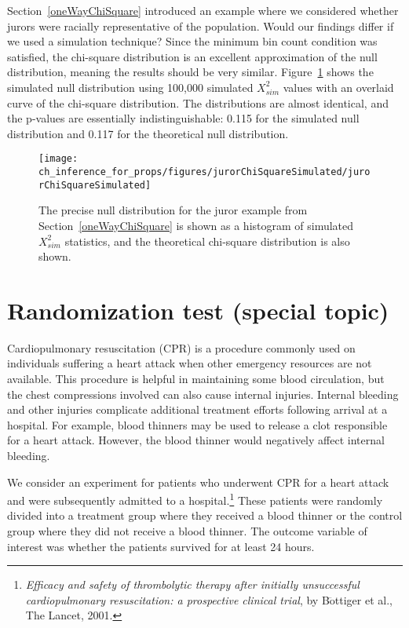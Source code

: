\begin{example}{Section~\ref{oneWayChiSquare} introduced an example where we considered whether jurors were racially representative of the population. Would our findings differ if we used a simulation technique?}
Since the minimum bin count condition was satisfied, the chi-square distribution is an excellent approximation of the null distribution, meaning the results should be very similar. Figure~\ref{jurorChiSquareSimulated} shows the simulated null distribution using 100,000 simulated $X_{sim}^2$ values with an overlaid curve of the chi-square distribution. The distributions are almost identical, and the p-values are essentially indistinguishable: 0.115 for the simulated null distribution and 0.117 for the theoretical null distribution.
\end{example}

\begin{figure}[h]
\centering
\texttt{[image: ch\_inference\_for\_props/figures/jurorChiSquareSimulated/jurorChiSquareSimulated]}
\caption{The precise null distribution for the juror example from Section~\ref{oneWayChiSquare} is shown as a histogram of simulated $X_{sim}^2$ statistics, and the theoretical chi-square distribution is also shown.}
\label{jurorChiSquareSimulated}
\end{figure}


\section[Randomization test (special topic)]{Randomization test (special topic)~}
\label{smallSampleHTForTwoOrMoreProportion}


Cardiopulmonary resuscitation (CPR) is a procedure commonly used on individuals suffering a heart attack when other emergency resources are not available. This procedure is helpful in maintaining some blood circulation, but the chest compressions involved can also cause internal injuries. Internal bleeding and other injuries complicate additional treatment efforts following arrival at a hospital. For example, blood thinners may be used to release a clot responsible for a heart attack. However, the blood thinner would negatively affect internal bleeding.

We consider an experiment for patients who underwent CPR for a heart attack and were subsequently admitted to a hospital.\footnote{\emph{Efficacy and safety of thrombolytic therapy after initially unsuccessful cardiopulmonary resuscitation: a prospective clinical trial}, by B$\ddot{\text{o}}$ttiger et al., The Lancet, 2001.} These patients were randomly divided into a treatment group where they received a blood thinner or the control group where they did not receive a blood thinner. The outcome variable of interest was whether the patients survived for at least 24 hours.

